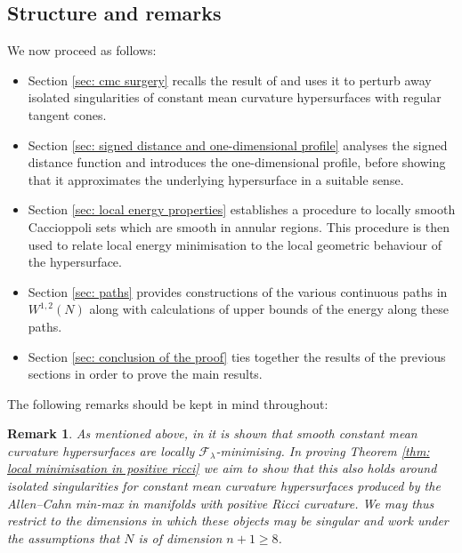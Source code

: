\documentclass[11pt]{article}
\newtheorem{rem}{Remark}
\begin{document}
\subsection{Structure and remarks}

We now proceed as follows:

\begin{itemize}
    \item Section \ref{sec: cmc surgery} recalls the result of \cite{Kostas23} and uses it to perturb away isolated singularities of constant mean curvature hypersurfaces with regular tangent cones. 
    
    \item Section \ref{sec: signed distance and one-dimensional profile} analyses the signed distance function and introduces the one-dimensional profile, before showing that it approximates the underlying hypersurface in a suitable sense.

    \item Section \ref{sec: local energy properties} establishes a procedure to locally smooth Caccioppoli sets which are smooth in annular regions. This procedure is then used to relate local energy minimisation to the local geometric behaviour of the hypersurface.

    \item Section \ref{sec: paths} provides constructions of the various continuous paths in $W^{1,2}(N)$ along with calculations of upper bounds of the energy along these paths.

    \item Section \ref{sec: conclusion of the proof} ties together the results of the previous sections in order to prove the main results.
\end{itemize}

The following remarks should be kept in mind throughout:

\begin{rem}\label{rem: singular dimensions}
    As mentioned above, in \cite[Proposition B.1]{bellettini-wickramasekera-cmc-reg} it is shown that smooth constant mean curvature hypersurfaces are locally $\mathcal{F}_\lambda$-minimising. In proving Theorem \ref{thm: local minimisation in positive ricci} we aim to show that this also holds around isolated singularities for constant mean curvature hypersurfaces produced by the Allen--Cahn min-max in manifolds with positive Ricci curvature. We may thus restrict to the dimensions in which these objects may be singular and work under the assumptions that $N$ is of dimension $n + 1 \geq 8$. 
\end{rem}
\end{document}
